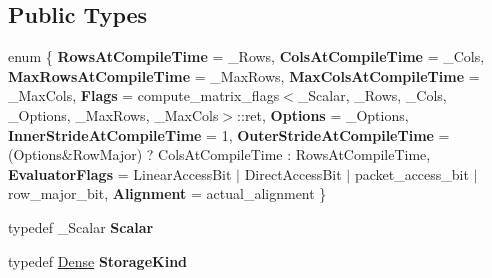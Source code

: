 \subsection*{Public Types}
\begin{DoxyCompactItemize}
\item 
\mbox{\label{struct_eigen_1_1internal_1_1traits_3_01_matrix_3_01___scalar_00_01___rows_00_01___cols_00_01___o4c9772ffb3eee7280611af9a479b3583_a94738987f31e1f4c848b9603d1f8978a}} 
enum \{ \newline
{\bfseries Rows\+At\+Compile\+Time} = \+\_\+\+Rows, 
{\bfseries Cols\+At\+Compile\+Time} = \+\_\+\+Cols, 
{\bfseries Max\+Rows\+At\+Compile\+Time} = \+\_\+\+Max\+Rows, 
{\bfseries Max\+Cols\+At\+Compile\+Time} = \+\_\+\+Max\+Cols, 
\newline
{\bfseries Flags} = compute\+\_\+matrix\+\_\+flags$<$\+\_\+\+Scalar, \+\_\+\+Rows, \+\_\+\+Cols, \+\_\+\+Options, \+\_\+\+Max\+Rows, \+\_\+\+Max\+Cols$>$\+::ret, 
{\bfseries Options} = \+\_\+\+Options, 
{\bfseries Inner\+Stride\+At\+Compile\+Time} = 1, 
{\bfseries Outer\+Stride\+At\+Compile\+Time} = (Options\&Row\+Major) ? Cols\+At\+Compile\+Time \+: Rows\+At\+Compile\+Time, 
\newline
{\bfseries Evaluator\+Flags} = Linear\+Access\+Bit $\vert$ Direct\+Access\+Bit $\vert$ packet\+\_\+access\+\_\+bit $\vert$ row\+\_\+major\+\_\+bit, 
{\bfseries Alignment} = actual\+\_\+alignment
 \}
\item 
\mbox{\label{struct_eigen_1_1internal_1_1traits_3_01_matrix_3_01___scalar_00_01___rows_00_01___cols_00_01___o4c9772ffb3eee7280611af9a479b3583_a5b97404d14838cb19985a20e492419fb}} 
typedef \+\_\+\+Scalar {\bfseries Scalar}
\item 
\mbox{\label{struct_eigen_1_1internal_1_1traits_3_01_matrix_3_01___scalar_00_01___rows_00_01___cols_00_01___o4c9772ffb3eee7280611af9a479b3583_a0ff46e6d20432a77d9091f1db6a23e3b}} 
typedef \mbox{\hyperlink{struct_eigen_1_1_dense}{Dense}} {\bfseries Storage\+Kind}
\item 
\mbox{\label{struct_eigen_1_1internal_1_1traits_3_01_matrix_3_01___scalar_00_01___rows_00_01___cols_00_01___o4c9772ffb3eee7280611af9a479b3583_a178d8fc56574c39a1657677cd3e28914}} 

\end{DoxyCompactItemize}
